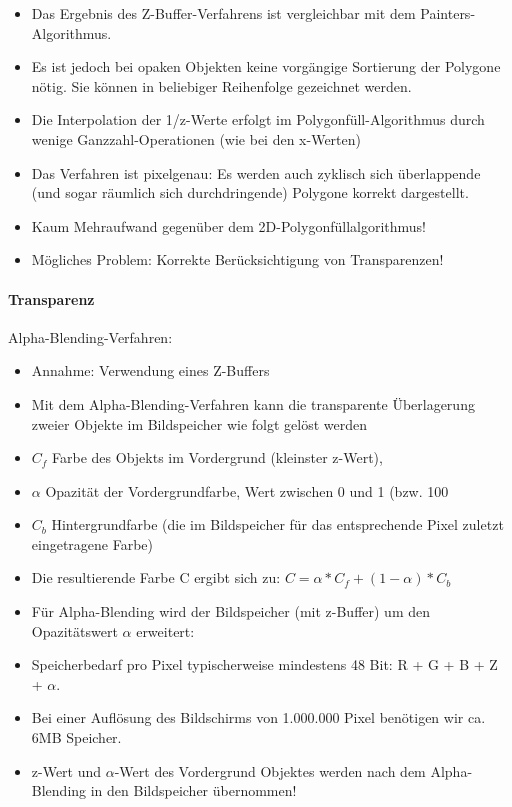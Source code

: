 \documentclass[10pt,landscape]{article}
\begin{document}
\begin{multicols}{3}

\begin{itemize}
  \item Das Ergebnis des Z-Buffer-Verfahrens ist vergleichbar mit dem Painters-Algorithmus.
  \item Es ist jedoch bei opaken Objekten keine vorgängige Sortierung der Polygone nötig. Sie können in beliebiger Reihenfolge gezeichnet werden.
  \item Die Interpolation der 1/z-Werte erfolgt im Polygonfüll-Algorithmus durch wenige Ganzzahl-Operationen (wie bei den x-Werten)
  \item Das Verfahren ist pixelgenau: Es werden auch zyklisch sich überlappende (und sogar räumlich sich durchdringende) Polygone korrekt dargestellt.
  \item Kaum Mehraufwand gegenüber dem 2D-Polygonfüllalgorithmus!
  \item Mögliches Problem: Korrekte Berücksichtigung von Transparenzen!
\end{itemize}

\paragraph{Transparenz}
Alpha-Blending-Verfahren: 
\begin{itemize}
  \item Annahme: Verwendung eines Z-Buffers
  \item Mit dem Alpha-Blending-Verfahren kann die transparente Überlagerung zweier Objekte im Bildspeicher wie folgt gelöst werden
  \item $C_f$ Farbe des Objekts im Vordergrund (kleinster z-Wert),
  \item $\alpha$ Opazität der Vordergrundfarbe, Wert zwischen 0 und 1 (bzw. 100%
  \item $C_b$ Hintergrundfarbe (die im Bildspeicher für das entsprechende Pixel zuletzt eingetragene Farbe)
  \item Die resultierende Farbe C ergibt sich zu: $C=\alpha*C_f+(1-\alpha)*C_b$
  \item Für Alpha-Blending wird der Bildspeicher (mit z-Buffer) um den Opazitätswert $\alpha$ erweitert:
  \item Speicherbedarf pro Pixel typischerweise mindestens 48 Bit: R + G + B + Z + $\alpha$.
  \item Bei einer Auflösung des Bildschirms von 1.000.000 Pixel benötigen wir ca. 6MB Speicher.
  \item z-Wert und $\alpha$-Wert des Vordergrund Objektes werden nach dem Alpha-Blending in den Bildspeicher übernommen!
\end{itemize}


\end{multicols}
\end{document}
